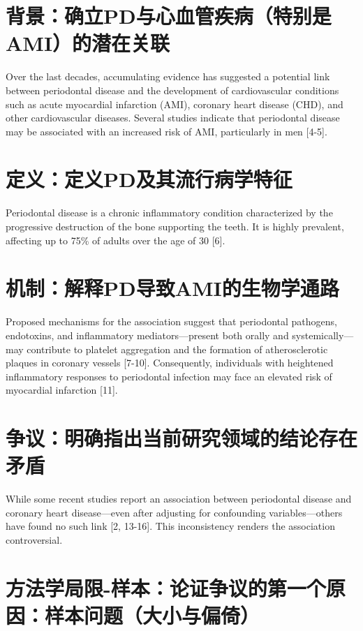 \documentclass[fontset=fandol]{ctexart}
\begin{document}
\section{背景：确立PD与心血管疾病（特别是AMI）的潜在关联}

Over the last decades, accumulating evidence has suggested a potential link between periodontal disease and the development of cardiovascular conditions such as acute myocardial infarction (AMI), coronary heart disease (CHD), and other cardiovascular diseases. Several studies indicate that periodontal disease may be associated with an increased risk of AMI, particularly in men [4-5].

\section{定义：定义PD及其流行病学特征}

Periodontal disease is a chronic inflammatory condition characterized by the progressive destruction of the bone supporting the teeth. It is highly prevalent, affecting up to 75\% of adults over the age of 30 [6].

\section{机制：解释PD导致AMI的生物学通路}

Proposed mechanisms for the association suggest that periodontal pathogens, endotoxins, and inflammatory mediators—present both orally and systemically—may contribute to platelet aggregation and the formation of atherosclerotic plaques in coronary vessels [7-10]. Consequently, individuals with heightened inflammatory responses to periodontal infection may face an elevated risk of myocardial infarction [11].

\section{争议：明确指出当前研究领域的结论存在矛盾}

While some recent studies report an association between periodontal disease and coronary heart disease—even after adjusting for confounding variables—others have found no such link [2, 13-16]. This inconsistency renders the association controversial.

\section{方法学局限-样本：论证争议的第一个原因：样本问题（大小与偏倚）}
\end{document}
